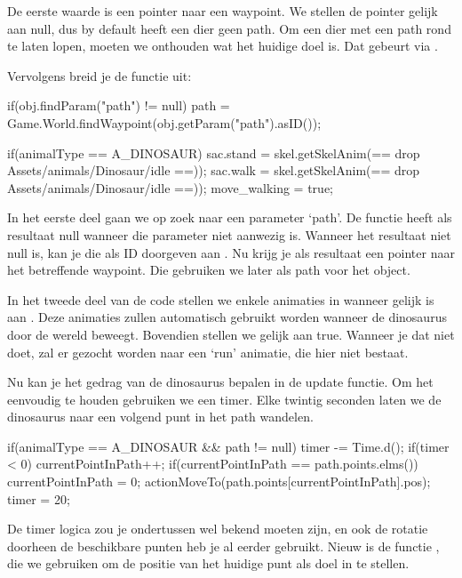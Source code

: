 De eerste waarde is een pointer naar een waypoint. We stellen de pointer gelijk aan null, dus by default heeft een dier geen path. Om een dier met een path rond te laten lopen, moeten we onthouden wat het huidige doel is. Dat gebeurt via .

Vervolgens breid je de  functie uit:

\begin{code}
if(obj.findParam("path") != null)
{
 	path = Game.World.findWaypoint(obj.getParam("path").asID());        
}

if(animalType == A_DINOSAUR)
{
 	sac.stand = skel.getSkelAnim(== drop Assets/animals/Dinosaur/idle ==));
 	sac.walk = skel.getSkelAnim(== drop Assets/animals/Dinosaur/idle ==));
 	move_walking = true;
}
\end{code}

In het eerste deel gaan we op zoek naar een parameter `path'. De functie  heeft als resultaat null wanneer die parameter niet aanwezig is. Wanneer het resultaat niet null is, kan je die als ID doorgeven aan . Nu krijg je als resultaat een pointer naar het betreffende waypoint. Die gebruiken we later als path voor het object.

In het tweede deel van de code stellen we enkele animaties in wanneer  gelijk is aan . Deze animaties zullen automatisch gebruikt worden wanneer de dinosaurus door de wereld beweegt. Bovendien stellen we  gelijk aan true. Wanneer je dat niet doet, zal er gezocht worden naar een `run' animatie, die hier niet bestaat.

Nu kan je het gedrag van de dinosaurus bepalen in de update functie. Om het eenvoudig te houden gebruiken we een timer. Elke twintig seconden laten we de dinosaurus naar een volgend punt in het path wandelen.

\begin{code}
if(animalType == A_DINOSAUR && path != null)
{
 	timer -= Time.d();
 	if(timer < 0)
 	{
    	currentPointInPath++;
    	if(currentPointInPath == path.points.elms())
    	{
       		currentPointInPath = 0;
    	}
    	actionMoveTo(path.points[currentPointInPath].pos);
    	timer = 20;
 	}         
}
\end{code}

De timer logica zou je ondertussen wel bekend moeten zijn, en ook de rotatie doorheen de beschikbare punten heb je al eerder gebruikt. Nieuw is de functie , die we gebruiken om de positie van het huidige punt als doel in te stellen.

